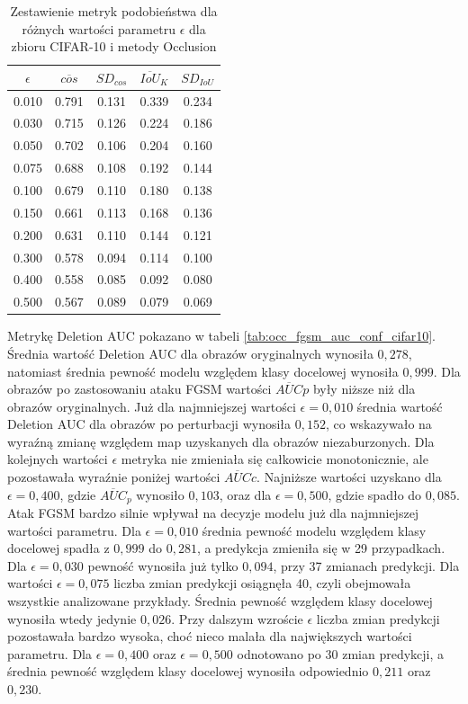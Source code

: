 \begin{table}[H] \centering \caption{Zestawienie metryk podobieństwa dla różnych wartości parametru \(\epsilon\) dla zbioru CIFAR-10 i metody Occlusion} \label{tab:occ_fgsm_cos_topk_cifar10} \begin{tabular}{ccccc} \toprule $\epsilon$ & $\overline{cos}$ & $SD_{cos}$ & $\overline{IoU}_{K}$ & $SD_{IoU}$ \\ \midrule 0.010 & 0.791 & 0.131 & 0.339 & 0.234 \\ 0.030 & 0.715 & 0.126 & 0.224 & 0.186 \\ 0.050 & 0.702 & 0.106 & 0.204 & 0.160 \\ 0.075 & 0.688 & 0.108 & 0.192 & 0.144 \\ 0.100 & 0.679 & 0.110 & 0.180 & 0.138 \\ 0.150 & 0.661 & 0.113 & 0.168 & 0.136 \\ 0.200 & 0.631 & 0.110 & 0.144 & 0.121 \\ 0.300 & 0.578 & 0.094 & 0.114 & 0.100 \\ 0.400 & 0.558 & 0.085 & 0.092 & 0.080 \\ 0.500 & 0.567 & 0.089 & 0.079 & 0.069 \\ \bottomrule \end{tabular} \end{table}

Metrykę Deletion AUC pokazano w tabeli \ref{tab:occ_fgsm_auc_conf_cifar10}. Średnia wartość Deletion AUC dla obrazów oryginalnych wynosiła $0{,}278$, natomiast średnia pewność modelu względem klasy docelowej wynosiła $0{,}999$. Dla obrazów po zastosowaniu ataku FGSM wartości $\overline{AUC}{p}$ były niższe niż dla obrazów oryginalnych. Już dla najmniejszej wartości $\epsilon = 0{,}010$ średnia wartość Deletion AUC dla obrazów po perturbacji wynosiła $0{,}152$, co wskazywało na wyraźną zmianę względem map uzyskanych dla obrazów niezaburzonych. Dla kolejnych wartości $\epsilon$ metryka nie zmieniała się całkowicie monotonicznie, ale pozostawała wyraźnie poniżej wartości $\overline{AUC}{c}$. Najniższe wartości uzyskano dla $\epsilon = 0{,}400$, gdzie $\overline{AUC}_{p}$ wynosiło $0{,}103$, oraz dla $\epsilon = 0{,}500$, gdzie spadło do $0{,}085$. Atak FGSM bardzo silnie wpływał na decyzje modelu już dla najmniejszej wartości parametru. Dla $\epsilon = 0{,}010$ średnia pewność modelu względem klasy docelowej spadła z $0{,}999$ do $0{,}281$, a predykcja zmieniła się w 29 przypadkach. Dla $\epsilon = 0{,}030$ pewność wynosiła już tylko $0{,}094$, przy 37 zmianach predykcji.
Dla wartości $\epsilon = 0{,}075$ liczba zmian predykcji osiągnęła 40, czyli obejmowała wszystkie analizowane przykłady. Średnia pewność względem klasy docelowej wynosiła wtedy jedynie $0{,}026$. Przy dalszym wzroście $\epsilon$ liczba zmian predykcji pozostawała bardzo wysoka, choć nieco malała dla największych wartości parametru. Dla $\epsilon = 0{,}400$ oraz $\epsilon = 0{,}500$ odnotowano po 30 zmian predykcji, a średnia pewność względem klasy docelowej wynosiła odpowiednio $0{,}211$ oraz $0{,}230$.

